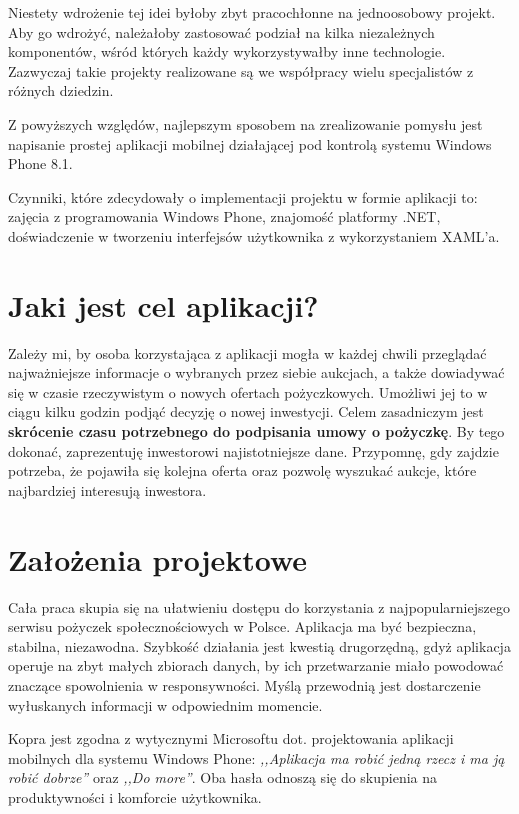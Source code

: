 \documentclass[a4paper,twoside,titlepage,openright]{book}
\begin{document}
Niestety wdrożenie tej idei byłoby zbyt pracochłonne na jednoosobowy projekt. Aby go wdrożyć, należałoby zastosować podział na kilka niezależnych komponentów, wśród których każdy wykorzystywałby inne technologie. Zazwyczaj takie projekty realizowane są we współpracy wielu specjalistów z różnych dziedzin.

Z powyższych względów, najlepszym sposobem na zrealizowanie pomysłu jest napisanie prostej aplikacji mobilnej działającej pod kontrolą systemu Windows Phone 8.1. 

Czynniki, które zdecydowały o implementacji projektu w formie aplikacji to: zajęcia z programowania Windows Phone, znajomość platformy .NET, doświadczenie w tworzeniu interfejsów użytkownika z wykorzystaniem XAML'a.

\section*{Jaki jest cel aplikacji?}

Zależy mi, by osoba korzystająca z aplikacji mogła w każdej chwili przeglądać najważniejsze informacje o wybranych przez siebie aukcjach, a także dowiadywać się w czasie rzeczywistym o nowych ofertach pożyczkowych. Umożliwi jej to w ciągu kilku godzin podjąć decyzję o nowej inwestycji. Celem zasadniczym jest \textbf{skrócenie czasu potrzebnego do podpisania umowy o pożyczkę}. By tego dokonać, zaprezentuję inwestorowi najistotniejsze dane. Przypomnę, gdy zajdzie potrzeba, że pojawiła się kolejna oferta oraz pozwolę wyszukać aukcje, które najbardziej interesują inwestora.

\section*{Założenia projektowe}

Cała praca skupia się na ułatwieniu dostępu do korzystania z najpopularniejszego serwisu pożyczek społecznościowych w Polsce. Aplikacja ma być bezpieczna, stabilna, niezawodna. Szybkość działania jest kwestią drugorzędną, gdyż aplikacja operuje na zbyt małych zbiorach danych, by ich przetwarzanie miało powodować znaczące spowolnienia w responsywności. Myślą przewodnią jest dostarczenie wyłuskanych informacji w odpowiednim momencie. 

Kopra jest zgodna z wytycznymi Microsoftu dot. projektowania aplikacji mobilnych dla systemu Windows Phone: \textit{,,Aplikacja ma robić jedną rzecz i ma ją robić dobrze''}\cite{wpDesign} oraz \textit{,,Do more''}\cite{doMore}. Oba hasła odnoszą się do skupienia na produktywności i komforcie użytkownika. 
\end{document}
